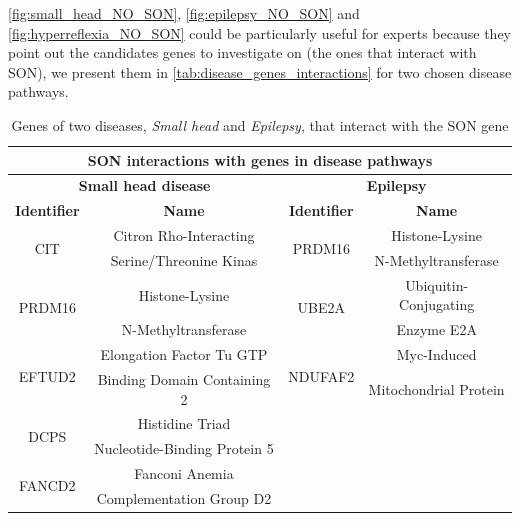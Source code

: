 \autoref{fig:small_head_NO_SON}, \autoref{fig:epilepsy_NO_SON} and \autoref{fig:hyperreflexia_NO_SON} could be particularly useful for experts because they point out the candidates genes to investigate on (the ones that interact with SON), we present them in \autoref{tab:disease_genes_interactions} for two chosen disease pathways.
\begin{table}[H]
\centering
\begin{tabular}{cc||cc}\hline \hline
    \multicolumn{4}{c}{\textbf{SON interactions with genes in disease pathways}} \\
    \hline \hline
    \multicolumn{2}{c||}{\textbf{Small head disease}} & \multicolumn{2}{c}{\textbf{Epilepsy}} \\
    \hline
    \textbf{Identifier} & \textbf{Name} & \textbf{Identifier} & \textbf{Name} \\
    \hline \hline
    \multirow{2}{*}{CIT} & Citron Rho-Interacting & \multirow{2}{*}{PRDM16} & Histone-Lysine  \\
    & Serine/Threonine Kinas & & N-Methyltransferase \\ \hline
    
    \multirow{2}{*}{PRDM16} & Histone-Lysine & \multirow{2}{*}{UBE2A} & Ubiquitin-Conjugating  \\
    & N-Methyltransferase & & Enzyme E2A \\ \hline
    
    \multirow{2}{*}{EFTUD2} & Elongation Factor Tu GTP & \multirow{2}{*}{NDUFAF2} & Myc-Induced \\
    & Binding Domain Containing 2 & & Mitochondrial Protein \\ \hline
    
    \multirow{2}{*}{DCPS} & Histidine Triad & \cellcolor{gray!30} & \cellcolor{gray!30} \\
    &  Nucleotide-Binding Protein 5 & \cellcolor{gray!30} & \cellcolor{gray!30} \\ \hline
    
    \multirow{2}{*}{FANCD2} & Fanconi Anemia & \cellcolor{gray!30} & \cellcolor{gray!30} \\
    & Complementation Group D2 & \cellcolor{gray!30} & \cellcolor{gray!30} \\
    \hline \hline
\end{tabular}
\caption{Genes of two diseases, \textit{Small head} and \textit{Epilepsy}, that interact with the SON gene}
\label{tab:disease_genes_interactions}
\end{table}

